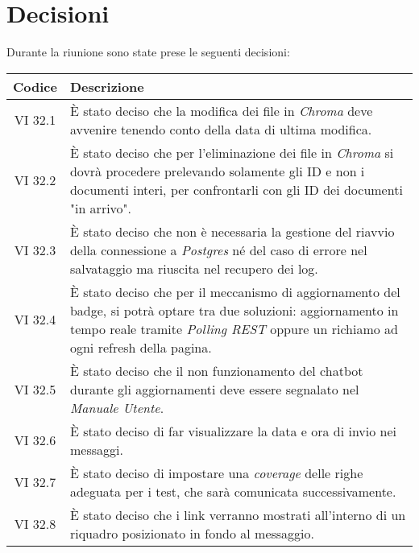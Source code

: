 
\section{Decisioni}

Durante la riunione sono state prese le seguenti decisioni:

\vspace{0.5cm}

\begin{table}[htbp]
    \centering
    \begin{tabular}{|c|p{}|}
        \hline
        \rowcolor[gray]{0.75}
        \textbf{Codice} & \textbf{Descrizione}\\
        \hline
        VI 32.1 & È stato deciso che la modifica dei file in \emph{Chroma} deve avvenire tenendo conto della data di ultima modifica.\\
        \hline
        VI 32.2 & È stato deciso che per l'eliminazione dei file in \emph{Chroma} si dovrà procedere prelevando solamente gli ID e non i documenti interi, per confrontarli con gli ID dei documenti "in arrivo".\\
        \hline
        VI 32.3 & È stato deciso che non è necessaria la gestione del riavvio della connessione a \emph{Postgres} né del caso di errore nel salvataggio ma riuscita nel recupero dei log.\\
        \hline 
        VI 32.4 & È stato deciso che per il meccanismo di aggiornamento del badge, si potrà optare tra due soluzioni: aggiornamento in tempo reale tramite \emph{Polling REST} oppure un richiamo ad ogni refresh della pagina.\\
        \hline
        VI 32.5 & È stato deciso che il non funzionamento del chatbot durante gli aggiornamenti deve essere segnalato nel \emph{Manuale Utente}.\\
        \hline
        VI 32.6 & È stato deciso di far visualizzare la data e ora di invio nei messaggi.\\
        \hline
        VI 32.7 & È stato deciso di impostare una \emph{coverage} delle righe adeguata per i test, che sarà comunicata successivamente.\\
        \hline
        VI 32.8 & È stato deciso che i link verranno mostrati all'interno di un riquadro posizionato in fondo al messaggio. \\

\end{tabular}
\end{table}
